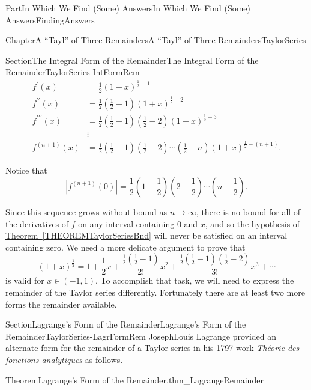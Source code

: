 \documentclass[oneside,10pt,]{book}
\newcommand{\xreffont}{\relax}
\newcommand{\pubtitle}[1]{\textsl{#1}}
\numberwithin{equation}{part}
\newcommand{\abs}[1]{\left|#1\right|}
\newcommand{\amp}{&}
\begin{document}
\begin{partptx}{Part}{In Which We Find (Some) Answers}{}{In Which We Find (Some) Answers}{}{}{FindingAnswers}
\begin{chapterptx}{Chapter}{A ``Tayl'' of Three Remainders}{}{A ``Tayl'' of Three Remainders}{}{}{TaylorSeries}
\begin{sectionptx}{Section}{The Integral Form of the Remainder}{}{The Integral Form of the Remainder}{}{}{TaylorSeries-IntFormRem}
\begin{align*}
f^\prime(x)\amp =\frac{1}{2}(1+x)^{\frac{1}{2}-1}\\
f^{\prime\prime}(x)\amp =\frac{1}{2}\left(\frac{1}{2}-1\right)(1+x)^{\frac{1}{2}-2}\\
f^{\prime\prime\prime}(x)\amp =\frac{1}{2}\left(\frac{1}{2}-1\right)\left(\frac{1}{2}-2 \right)(1+x)^{\frac{1}{2}-3}\\
\amp \vdots\\
f^{(n+1)}(x)\amp =\frac{1}{2}\left(\frac{1}{2}-1\right)\left(\frac{1}{2}-2\right) \cdots\left(\frac{1}{2}-n\right)(1+x)^{\frac{1}{2}-(n+1)}\text{.}
\end{align*}
%
\par
Notice that%
\begin{equation*}
\abs{f^{(n+1)}(0)}=\frac{1}{2}\left(1-\frac{1}{2}\right)\left(2-\frac{1}{2}\right)\cdots\left(n-\frac{1}{2}\right)\text{.}
\end{equation*}
%
\par
Since this sequence grows without bound as \(n\rightarrow\infty\), there is no bound for all of the derivatives of \(f\) on any interval containing \(0\) and \(x\), and so the hypothesis of \hyperref[THEOREMTaylorSeriesBnd]{Theorem~{\xreffont\ref{THEOREMTaylorSeriesBnd}}} will never be satisfied on an interval containing zero.  We need a more delicate argument to prove that%
\begin{equation*}
\left(1+x\right)^{\frac12}=1+\frac{1}{2}x+\frac{\frac{1}{2}\left(\frac{1}{2}-1\right)}{2!}x^2+\frac{\frac{1}{2}\left(\frac{1}{2}-1\right)\left(\frac{1}{2}-2\right)}{3!}x^3+\cdots
\end{equation*}
is valid for \(x\in(-1,1)\).  To accomplish that task, we will need to express the remainder of the Taylor series differently.  Fortunately there are at least two more forms the remainder available.%
\end{sectionptx}
%
%
\typeout{************************************************}
\typeout{************************************************}
%
\begin{sectionptx}{Section}{Lagrange's Form of the Remainder}{}{Lagrange's Form of the Remainder}{}{}{TaylorSeries-LagrFormRem}
%
 Joseph\textendash{}Louis Lagrange provided an alternate form for the remainder of a Taylor series in his 1797 work \pubtitle{Théorie des fonctions analytiques} as follows.%
\begin{theorem}{Theorem}{Lagrange's Form of the Remainder.}{}{thm_LagrangeRemainder}%

\end{theorem}
\end{sectionptx}
\end{chapterptx}
\end{partptx}
\end{document}
